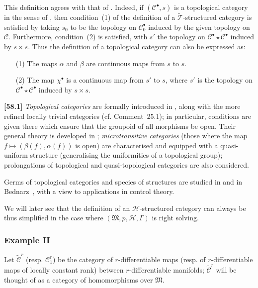 \documentclass[a4paper,fleqn]{article}
\theoremstyle{plain}
\theoremstyle{definition}
\newenvironment{longcomm}[1]
  {\noindent\textbf{[#1]}\rmfamily}
  {}
\newcommand{\CC}{\mathcal{C}}
\newcommand{\tCC}{\widetilde{\CC}}
\newcommand{\HH}{\mathcal{H}}
\newcommand{\MM}{\mathfrak{M}}
\newcommand{\TT}{\mathcal{T}}
\newcommand{\tTT}{\widetilde{\TT}}
\begin{document}
This definition agrees with that of \cite{3b}.
Indeed, if $(\CC^\bullet,s)$ is a topological category in the sense of \cite{3b}, then condition~(1) of the definition of a $\tTT$-structured category is satisfied by taking $s_0$ to be the topology on $\CC_0^\bullet$ induced by the given topology on $\CC$.
Furthermore, condition~(2) is satisfied, with $s'$ the topology on $\CC^\bullet\star\CC^\bullet$ induced by $s\times s$.
Thus the definition of a topological category can also be expressed as:

\begin{enumerate}
  \item[\normalfont(1)]
    The maps $\alpha$ and $\beta$ are continuous maps from $s$ to $s$.
  \item[\normalfont(2)]
    The map $\chi^\bullet$ is a continuous map from $s'$ to $s$, where $s'$ is the topology on $\CC^\bullet\star\CC^\bullet$ induced by $s\times s$.
\end{enumerate}

\begin{longcomm}{58.1}
  \emph{Topological categories} are formally introduced in \cite{coll50}, along with the more refined locally trivial categories (cf. Comment~25.1);
  in particular, conditions are given there which ensure that the groupoid of all morphisms be open.
  Their general theory is developed in \cite{coll92};
  \emph{microtransitive categories} (those where the map $f\mapsto(\beta(f),\alpha(f))$ is open) are characterised and equipped with a quasi-uniform structure (generalising the uniformities of a topological group);
  prolongations of topological and quasi-topological categories are also considered.

  Germs of topological categories and species of structures are studied in \cite{comm29} and in Bednarz~\cite{comm3}, with a view to applications in control theory.
\end{longcomm}

We will later see that the definition of an $\HH$-structured category can always be thus simplified in the case where $(\MM,p,\HH,\Gamma)$ is right solving.


\subsubsection*{Example II}
\label{section:ii.3.ii}

Let $\tCC^r$ (resp. $\CC_1^r$) be the category of $r$-differentiable maps (resp. of $r$-differentiable maps of locally constant rank) between $r$-differentiable manifolds;
$\tCC^r$ will be thought of as a category of homomorphisms over $\MM$.
\end{document}

